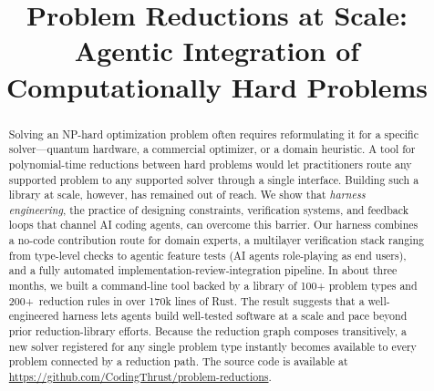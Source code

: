 \documentclass[conference]{IEEEtran}
\begin{document}
\title{Problem Reductions at Scale: Agentic Integration of Computationally Hard Problems}

\author{
}

\maketitle

\begin{abstract}
Solving an NP-hard optimization problem often requires reformulating it for a specific solver---quantum hardware, a commercial optimizer, or a domain heuristic.
A tool for polynomial-time reductions between hard problems would let practitioners route any supported problem to any supported solver through a single interface.
Building such a library at scale, however, has remained out of reach.
We show that \emph{harness engineering}, the practice of designing constraints, verification systems, and feedback loops that channel AI coding agents, can overcome this barrier.
Our harness combines a no-code contribution route for domain experts, a multilayer verification stack ranging from type-level checks to agentic feature tests (AI agents role-playing as end users), and a fully automated implementation-review-integration pipeline.
In about three months, we built a command-line tool backed by a library of 100+ problem types and 200+~reduction rules in over 170k lines of Rust.
The result suggests that a well-engineered harness lets agents build well-tested software at a scale and pace beyond prior reduction-library efforts.
Because the reduction graph composes transitively, a new solver registered for any single problem type instantly becomes available to every problem connected by a reduction path.
The source code is available at \url{https://github.com/CodingThrust/problem-reductions}.
\end{abstract}
\end{document}

